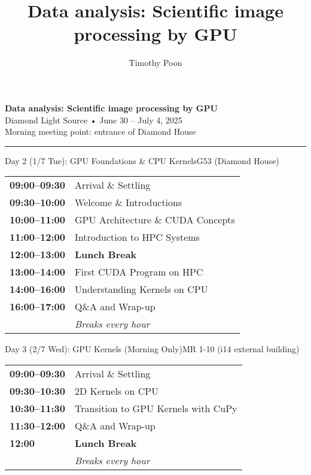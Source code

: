 \documentclass[11pt, a4paper]{article}
\title{Data analysis: Scientific image processing by GPU}
\author{Timothy Poon}
\date{}
\begin{document}
\begin{center}
    {\LARGE\bfseries Data analysis: Scientific image processing by GPU}\\[0.5em]
    {\large\color{textsecondary} Diamond Light Source • June 30 -- July 4, 2025}\\[0.3em]
    {\color{textmuted} Morning meeting point: entrance of Diamond House}
\end{center}

\vspace{1em}
{\color{accentpurple}\hrule height 2pt}
\vspace{1.5em}

\begin{daycard}{Day 2 (1/7 Tue): GPU Foundations \& CPU Kernels}{G53 (Diamond House)}
\begin{tabular}{@{}p{2.8cm}p{\dimexpr\linewidth-3.1cm}@{}}
\textbf{\color{textmuted}09:00--09:30} & Arrival \& Settling \\
\textbf{\color{textmuted}09:30--10:00} & Welcome \& Introductions \\
\textbf{\color{textmuted}10:00--11:00} & GPU Architecture \& CUDA Concepts \\
\textbf{\color{textmuted}11:00--12:00} & Introduction to HPC Systems \\
\textbf{\color{textmuted}12:00--13:00} & \textbf{Lunch Break} \\
\textbf{\color{textmuted}13:00--14:00} & First CUDA Program on HPC \\
\textbf{\color{textmuted}14:00--16:00} & Understanding Kernels on CPU \\
\textbf{\color{textmuted}16:00--17:00} & Q\&A and Wrap-up \\[0.3em]
& \textit{\color{textsecondary}Breaks every hour}
\end{tabular}
\end{daycard}

\vspace{1em}

\begin{daycard}{Day 3 (2/7 Wed): GPU Kernels (Morning Only)}{MR 1-10 (i14 external building)}
\begin{tabular}{@{}p{2.8cm}p{\dimexpr\linewidth-3.1cm}@{}}
\textbf{\color{textmuted}09:00--09:30} & Arrival \& Settling \\
\textbf{\color{textmuted}09:30--10:30} & 2D Kernels on CPU \\
\textbf{\color{textmuted}10:30--11:30} & Transition to GPU Kernels with CuPy \\
\textbf{\color{textmuted}11:30--12:00} & Q\&A and Wrap-up \\
\textbf{\color{textmuted}12:00} & \textbf{Lunch Break} \\[0.3em]
& \textit{\color{textsecondary}Breaks every hour}
\end{tabular}
\end{daycard}
\end{document}
